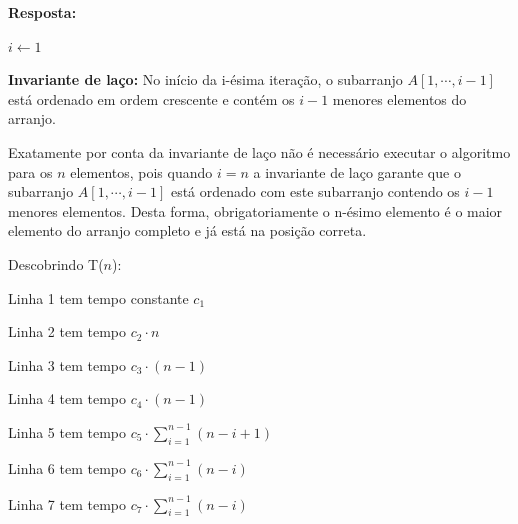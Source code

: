 \documentclass{article}
\begin{document}
    \textbf{Resposta:}

    \begin{algorithm}[H]
        \caption{Ordenação por seleção}

        $i \leftarrow 1$


    \end{algorithm}

    \textbf{Invariante de laço:} No início da i-ésima iteração, o subarranjo $A[1,\cdots, i - 1]$ está ordenado em ordem crescente e contém os $i-1$ menores elementos do arranjo.

    Exatamente por conta da invariante de laço não é necessário executar o algoritmo para os $n$ elementos, pois quando $i=n$ a invariante de laço garante que o subarranjo $A[1,\cdots, i - 1]$ está ordenado com este subarranjo contendo os $i-1$ menores elementos. Desta forma, obrigatoriamente o n-ésimo elemento é o maior elemento do arranjo completo e já está na posição correta.
    

    Descobrindo T($n$):

    Linha 1 tem tempo constante $c_1$

    Linha 2 tem tempo $c_2 \cdot n$

    Linha 3 tem tempo $c_3 \cdot (n-1)$

    Linha 4 tem tempo $c_4 \cdot (n-1)$
    
    Linha 5 tem tempo $c_5 \cdot \sum_{i = 1}^{n-1} {(n - i + 1)}$

    Linha 6 tem tempo $c_6 \cdot \sum_{i = 1}^{n-1} {(n - i)}$

    Linha 7 tem tempo $c_7 \cdot \sum_{i = 1}^{n - 1}{(n - i)}$
\end{document}
